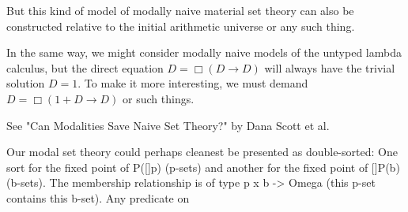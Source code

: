 \begin{TODOblock}
But this kind of model of modally naive material set theory can also be constructed relative to the initial arithmetic universe or any such thing.

In the same way, we might consider modally naive models of the untyped lambda calculus, but the direct equation $D = \Box(D \to D)$ will always have the trivial solution $D = 1$. To make it more interesting, we must demand $D = \Box(1 + D \to D)$ or such things.

See "Can Modalities Save Naive Set Theory?" by Dana Scott et al.

Our modal set theory could perhaps cleanest be presented as double-sorted: One sort for the fixed point of P([]p) (p-sets) and another for the fixed point of []P(b) (b-sets). The membership relationship is of type p x b -> Omega (this p-set contains this b-set). Any predicate on 
\end{TODOblock}

\fileend
